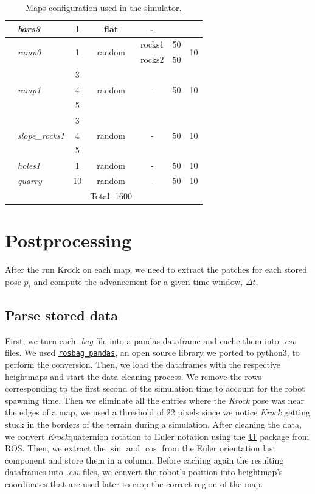 \documentclass[../document.tex]{subfiles}
\begin{document}
\begin{table} [htbp]
\begin{tabular}[]{@{}llccccc@{}}
      \hline
      &\emph{bars3} & 1 & flat  & - &  &  \\
      \hline
      &\multirow{2}{*}{\emph{ramp0}} & \multirow{2}{*}{1} & \multirow{2}{*}{random} & rocks1 & 50 & \multirow{2}{*}{10} \\
      &&&& rocks2 & 50 &  \\
      \hline
      &\multirow{3}{*}{\emph{ramp1}} & 3 & \multirow{3}{*}{random} & \multirow{3}{*}{-} & \multirow{3}{*}{50} & \multirow{3}{*}{10} \\
      && 4 &&&& \\
      && 5 &&&& \\
      \hline 
      &\multirow{3}{*}{\emph{slope\_rocks1}} & 3 & \multirow{3}{*}{random} & \multirow{3}{*}{-} & \multirow{3}{*}{50} & \multirow{3}{*}{10} \\
      && 4 &&&& \\
      && 5 &&&& \\
      \hline
      &\emph{holes1} & 1 &random & - & 50 & 10 \\
      \hline
      &\emph{quarry} & 10 &random & - & 50 & 10 \\
      &&& Total: 1600 \\ 
      \bottomrule   
    \end{tabular}
    \label{table: maps}
    \caption{Maps configuration used in the simulator.}
  \end{table}

\section{Postprocessing}
After the run Krock on each map, we need to extract the patches for each stored pose $p_i$ and compute the advancement for a given time window, $\Delta t$.
\subsection{Parse stored data}
First, we turn each \emph{.bag} file into a pandas dataframe and cache them into \emph{.csv} files. We used \href{https://github.com/aktaylor08/RosbagPandas}{\texttt{rosbag\_pandas}}, an open source library we ported to python3, to perform the conversion.
Then, we load the dataframes with the respective heightmaps and start the data cleaning process. We remove the rows corresponding tp the first second of the simulation time to account for the robot spawning time. Then we eliminate all the entries where the \emph{Krock} pose was near the edges of a map, we used a threshold of $22$ pixels since we notice  \emph{Krock} getting stuck in the borders of the terrain during a simulation. 
After cleaning the data, we convert \emph{Krock}quaternion rotation to Euler notation using the \href{https://duckduckgo.com/?q=ros+tf&atb=v154-1__&ia=web}{\texttt{tf}} package from ROS. Then, we extract the $\sin$ and $\cos$ from the Euler orientation last component and store them in a column.
Before caching again the resulting dataframes into \emph{.csv} files, we convert the robot's position into heightmap's coordinates that are used later to crop the correct region of the map.
\end{document}
